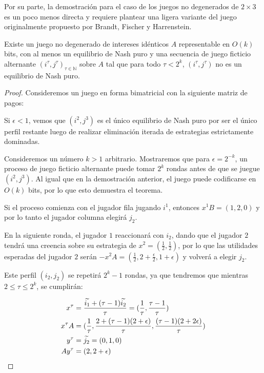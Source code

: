 Por su parte, la demostración para el caso de los juegos no degenerados de $2 \times 3$ es un poco menos directa y requiere plantear una ligera variante del juego originalmente propuesto por Brandt, Fischer y Harrenstein. 

\begin{theorem} \label{teorema:afp:velocidad:nondegen}
    Existe un juego no degenerado de intereses idénticos $A$ representable en $O(k)$ bits, con al menos un equilibrio de Nash puro y una secuencia de juego ficticio alternante $(i^\tau, j^\tau)_{\tau \in \mathbb{N}}$ sobre $A$ tal que para todo $\tau < 2^k$, $(i^\tau, j^\tau)$ no es un equilibrio de Nash puro.
\end{theorem}

\begin{proof}
    Consideremos un juego en forma bimatricial con la siguiente matriz de pagos:

    

    Si $\epsilon < 1$, vemos que $(i^2, j^3)$ es el único equilibrio de Nash puro por ser el único perfil restante luego de realizar eliminación iterada de estrategias estrictamente dominadas.

    Consideremos un número $k > 1$ arbitrario. Mostraremos que para $\epsilon = 2^{-k}$, un proceso de juego ficticio alternante puede tomar $2^k$ rondas antes de que se juegue $(i^2, j^3)$. Al igual que en la demostración anterior, el juego puede codificarse en $O(k)$ bits, por lo que esto demuestra el teorema.

    Si el proceso comienza con el jugador fila jugando $i^1$, entonces $x^1B = (1, 2, 0)$ y por lo tanto el jugador columna elegirá $j_2$.

    En la siguiente ronda, el jugador $1$ reaccionará con $i_2$, dando que el jugador $2$ tendrá una creencia sobre su estrategia de $x^2 = (\frac{1}{2},\frac{1}{2})$, por lo que las utilidades esperadas del jugador $2$ serán $-x^2A = (\frac{1}{2}, 2 + \frac{\epsilon}{2}, 1 + \epsilon)$ y volverá a elegir $j_2$.

    Este perfil $(i_2, j_2)$ se repetirá $2^k - 1$ rondas, ya que tendremos que mientras $2 \le \tau \le 2^k$, se cumplirán:

    \begin{align*}
        x^\tau     &= \frac{\widetilde{i_1} + (\tau - 1) \widetilde{i_2}}{\tau} = (\frac{1}{\tau}, \frac{\tau - 1}{\tau}) \\
        x^{\tau}A &= (\frac{1}{\tau}, \frac{2 + (\tau - 1)(2 + \epsilon)}{\tau}, \frac{(\tau - 1)(2 + 2 \epsilon)}{\tau}) \\
        y^\tau     &= \widetilde{j_2} = (0, 1, 0) \\
        Ay^\tau    &= (2, 2 + \epsilon) \\
    \end{align*}


\end{proof}
